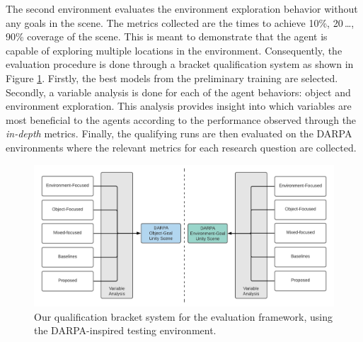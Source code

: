 The second environment evaluates the environment exploration behavior without any goals in the scene. The metrics collected are the times to achieve 10\%, 20\,…, 90\% coverage of the scene. This is meant to demonstrate that the agent is capable of exploring multiple locations in the environment.
Consequently, the evaluation procedure is done through a bracket qualification system as shown in Figure \ref{fig:darpa-bracket}. Firstly, the best models from the preliminary training are selected. Secondly, a variable analysis is done for each of the agent behaviors: object and environment exploration. 
This analysis provides insight into which variables are most beneficial to the agents according to the performance observed through the \textit{in-depth} metrics. 
Finally, the qualifying runs are then evaluated on the DARPA environments where the relevant metrics for each research question are collected.
\begin{figure}[!ht]
        \centering
        \includegraphics[width=1\textwidth]{images/darpa-qualification-bracket_2.pdf} 
        \caption{Our qualification bracket system for the evaluation framework, using the DARPA-inspired testing environment.}
        \label{fig:darpa-bracket}
\end{figure}










